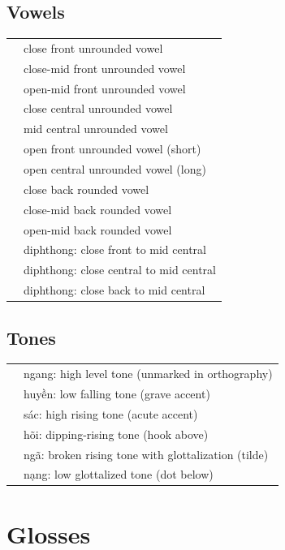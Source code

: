 \documentclass{article}
\begin{document}
\subsection{Vowels}

\begin{xltabular}{\textwidth}{lL}
   & close front unrounded vowel \\
   & close-mid front unrounded vowel \\
   & open-mid front unrounded vowel \\
   & close central unrounded vowel \\
   & mid central unrounded vowel \\
   & open front unrounded vowel (short) \\
   & open central unrounded vowel (long) \\
   & close back rounded vowel \\
   & close-mid back rounded vowel \\
   & open-mid back rounded vowel \\
   & diphthong: close front to mid central \\
   & diphthong: close central to mid central \\
   & diphthong: close back to mid central \\
\end{xltabular}

\subsection{Tones}

\begin{xltabular}{\textwidth}{lL}
   & ngang: high level tone (unmarked in orthography) \\
   & huy\`{\^e}n: low falling tone (grave accent) \\
   & s\'ac: high rising tone (acute accent) \\
   & h\~oi: dipping-rising tone (hook above) \\
   & ng\~a: broken rising tone with glottalization (tilde) \\
   & n\d{a}ng: low glottalized tone (dot below) \\
\end{xltabular}

\newpage\section{Glosses}
\end{document}
